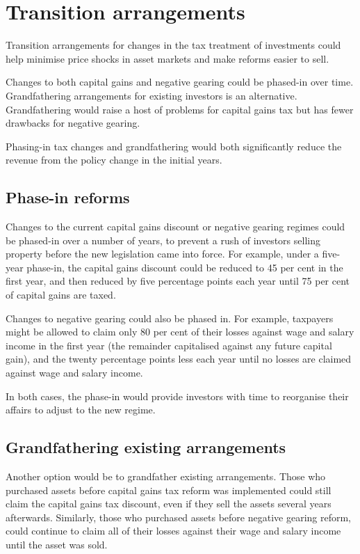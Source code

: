 \documentclass{grattanAlpha}\usepackage[]{graphicx}\usepackage[]{color}
\begin{document}
\chapter{Transition arrangements}
Transition arrangements for changes in the tax treatment of investments could help minimise price shocks in asset markets and make reforms easier to sell. 

Changes to both capital gains and negative gearing could be phased-in over time. Grandfathering arrangements for existing investors is an alternative. Grandfathering would raise a host of problems for capital gains tax but has fewer drawbacks for negative gearing. 

Phasing-in tax changes and grandfathering would both significantly reduce the revenue from the policy change in the initial years. 

\section{Phase-in reforms}
Changes to the current capital gains discount or negative gearing regimes could be phased-in over a number of years, to prevent a rush of investors selling property before the new legislation came into force. For example, under a five-year phase-in, the capital gains discount could be reduced to 45 per cent in the first year, and then reduced by five percentage points each year until 75 per cent of capital gains are taxed. 

Changes to negative gearing could also be phased in. For example, taxpayers might be allowed to claim only 80 per cent of their losses against wage and salary income in the first year (the remainder capitalised against any future capital gain), and the twenty percentage points less each year until no losses are claimed against wage and salary income.

In both cases, the phase-in would provide investors with time to reorganise their affairs to adjust to the new regime.

\section{Grandfathering existing arrangements}
Another option would be to grandfather existing arrangements. Those who purchased assets before capital gains tax reform was implemented could still claim the capital gains tax discount, even if they sell the assets several years afterwards. Similarly, those who purchased assets before negative gearing reform, could continue to claim all of their losses against their wage and salary income until the asset was sold.
\end{document}
